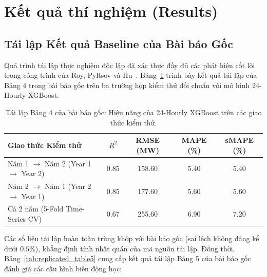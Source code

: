 \section{Kết quả thí nghiệm (Results)}
\label{sec:results}

\subsection{Tái lập Kết quả Baseline của Bài báo Gốc}
Quá trình tái lập thực nghiệm độc lập đã xác thực đầy đủ các phát hiện cốt lõi trong công trình của Roy, Pyltsov và Hu~\cite{roy2025hourly}. Bảng~\ref{tab:replicated_table4} trình bày kết quả tái lập của Bảng 4 trong bài báo gốc trên ba trường hợp kiểm thử đối chuẩn với mô hình 24-Hourly XGBoost.

\begin{table}[htbp]
    \centering
    \caption{Tái lập Bảng 4 của bài báo gốc: Hiệu năng của 24-Hourly XGBoost trên các giao thức kiểm thử.}
    \label{tab:replicated_table4}
    \begin{tabular}{lcccc}
        \toprule
        \textbf{Giao thức Kiểm thử} & \textbf{$R^2$} & \textbf{RMSE (MW)} & \textbf{MAPE (\%)} & \textbf{sMAPE (\%)} \\
        \midrule
        Năm 1 $\to$ Năm 2 (Year 1 $\to$ Year 2) & 0.85 & 158.60 & 5.40 & 5.40 \\
        Năm 2 $\to$ Năm 1 (Year 2 $\to$ Year 1) & 0.85 & 177.60 & 5.60 & 5.60 \\
        Cả 2 năm (5-Fold Time-Series CV) & 0.67 & 255.60 & 6.90 & 7.20 \\
        \bottomrule
    \end{tabular}
\end{table}

Các số liệu tái lập hoàn toàn trùng khớp với bài báo gốc (sai lệch không đáng kể dưới $0.5\%$), khẳng định tính nhất quán của mã nguồn tái lập. Đồng thời, Bảng~\ref{tab:replicated_table5} cung cấp kết quả tái lập Bảng 5 của bài báo gốc đánh giá các cấu hình biến động học:

